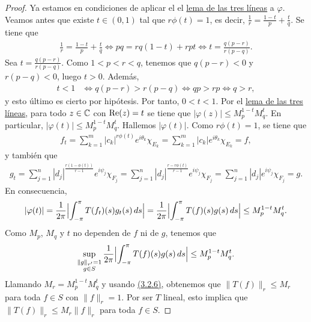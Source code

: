 \documentclass[a4paper, 12pt]{book}
\begin{document}
\begin{proof}
    Ya estamos en condiciones de aplicar el el \hyperref[3.2.3]{lema de las tres líneas} a $\varphi$. Veamos antes que existe $t \in (0,1)$ tal que $r\phi(t) = 1$, es decir, $\frac{1}{r} = \frac{1-t}{p}+\frac{t}{q}$. Se tiene que
    \begin{align*}
        \frac{1}{r} = \frac{1-t}{p}+\frac{t}{q} \iff pq = rq(1-t)+rpt \iff t = \frac{q(p-r)}{r(p-q)}.
    \end{align*}
    Sea $t = \frac{q(p-r)}{r(p-q)}$. Como $1 < p < r < q$, tenemos que $q(p-r) < 0$ y $r(p-q) < 0$, luego $t > 0$. Además,
    \[\begin{aligned}
        t < 1 &\iff q(p-r) > r(p-q) \iff qp > rp \iff q > r,
    \end{aligned}\]
    y esto último es cierto por hipótesis. Por tanto, $0 < t < 1$. Por el \hyperref[3.2.3]{lema de las tres líneas}, para todo $z\in\C$ con $\real(z)=t$ se tiene que $|\varphi(z)| \leq M_p^{1-t}M_q^t$. En particular, $|\varphi(t)| \leq M_p^{1-t}M_q^t$. Hallemos $|\varphi(t)|$. Como $r\phi(t) = 1$, se tiene que
    \begin{align*}
        f_t = \sum_{k=1}^m |c_k|^{r\phi(t)}e^{i\theta_k}\chi_{E_k} = \sum_{k=1}^m |c_k|e^{i\theta_k}\chi_{E_k} = f,
    \end{align*}
    y también que
    \begin{align*}
        g_t = \sum_{j=1}^n |d_j|^{\frac{r(1-\phi(t))}{r-1}}e^{i\psi_j}\chi_{F_j} =  \sum_{j=1}^n |d_j|^{\frac{r-r\phi(t)}{r-1}}e^{i\psi_j}\chi_{F_j}=  \sum_{j=1}^n |d_j|e^{i\psi_j}\chi_{F_j} = g.
    \end{align*}
    En consecuencia,
    \[|\varphi(t)| = \frac{1}{2\pi}\Bigl|\integral[s]{-\pi}{\pi}{T(f_t)(s)g_t(s)}\Bigr| =  \frac{1}{2\pi}\Bigl|\integral[s]{-\pi}{\pi}{T(f)(s)g(s)}\Bigr| \leq M_p^{1-t}M_q^t.\]
    Como $M_p$, $M_q$ y $t$ no dependen de $f$ ni de $g$, tenemos que
    \[\sup_{\substack{\|g\|_{r'}=1 \\ g \in S}}\frac{1}{2\pi}\Bigl|\integral[s]{-\pi}{\pi}{T(f)(s)g(s)}\Bigr| \leq M_p^{1-t}M_q^t.\]
    Llamando $M_r = M_p^{1-t}M_q^t$ y usando \hyperref[3.2.6]{(3.2.6)}, obtenemos que $\|T(f)\|_r \leq M_r$ para toda $f \in S$ con $\|f\|_r = 1$. Por ser $T$ lineal, esto implica que $\|T(f)\|_r \leq M_r\|f\|_r$ para toda $f \in S$.


\end{proof}
\end{document}
